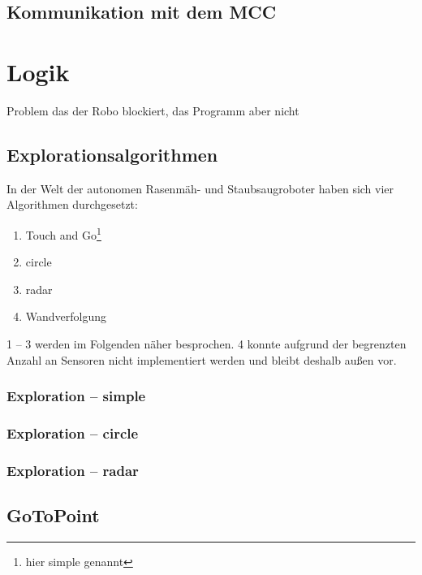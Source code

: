 \documentclass[10pt,a4paper]{scrartcl}
\begin{document}
\subsection{Kommunikation mit dem MCC}
\section{Logik}
Problem das der Robo blockiert, das Programm aber nicht
\subsection{Explorationsalgorithmen}
In der Welt der autonomen Rasenmäh- und Staubsaugroboter haben sich vier Algorithmen durchgesetzt:
\begin{enumerate}
\item Touch and Go\footnote{hier simple genannt}
\item circle
\item radar
\item Wandverfolgung
\end{enumerate}
1 -- 3 werden im Folgenden näher besprochen. 4 konnte aufgrund der begrenzten Anzahl an Sensoren nicht implementiert werden und bleibt deshalb außen vor. 
\subsubsection{Exploration -- simple}
\subsubsection{Exploration -- circle}
\subsubsection{Exploration -- radar}
\subsection{GoToPoint}
\end{document}
